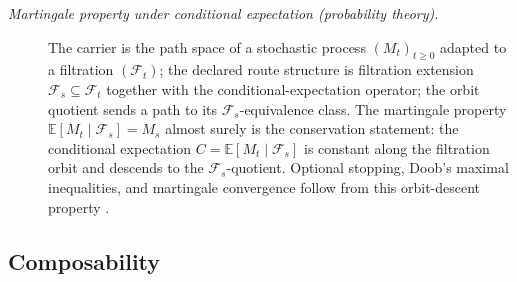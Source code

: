 \documentclass[11pt]{article}
\theoremstyle{definition}
\begin{document}
\begin{description}
\item[\emph{Martingale property under conditional
expectation (probability theory).}]
The carrier is the path space of a stochastic process
\((M_t)_{t\ge 0}\) adapted to a filtration
\((\mathcal F_t)\); the declared route structure is
filtration extension \(\mathcal F_s\subseteq\mathcal F_t\)
together with the conditional-expectation operator;
the orbit quotient sends a path to its
\(\mathcal F_s\)-equivalence class.  The martingale
property
\(\mathbb E[M_t\mid\mathcal F_s]=M_s\) almost surely
is the conservation statement: the conditional
expectation \(C=\mathbb E[M_t\mid\mathcal F_s]\) is
constant along the filtration orbit and descends to
the \(\mathcal F_s\)-quotient.  Optional stopping,
Doob's maximal inequalities, and martingale
convergence follow from this orbit-descent property
\citep{Doob1953Stochastic}.
\end{description}

\subsection{Composability}\label{sec:status-records-coherence:composability}
\end{document}

